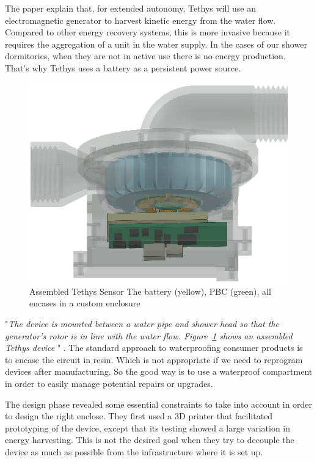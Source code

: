 \documentclass[10pt,journal,compsoc]{IEEEtran}
\begin{document}
The paper explain that, for extended autonomy, Tethys will use an electromagnetic generator to harvest kinetic energy from the water flow. Compared to other energy recovery systems, this is more invasive because it requires the aggregation of a unit in the water supply. In the cases of our shower dormitories, when they are not in active use there is no energy production. That's why Tethys uses a battery as a persistent power source.
\begin{center}
    \begin{figure}[!t]
        \includegraphics[scale=0.45]{assembled-tethys-sensor.png}
        \caption{\label{étiquette} Assembled Tethys Sensor\cite{IEEEhowto:} The battery (yellow), PBC (green), all encases in a custom enclosure}
    \end{figure}

\end{center}
"\emph{The device is mounted between a water pipe and shower head so
that the generator’s rotor is in line with the water flow. Figure~\ref{étiquette} shows an assembled Tethys device }" \cite{IEEEhowto:}.
The standard approach to waterproofing consumer products is to encase the circuit in resin. Which is not appropriate if we need to reprogram devices after manufacturing. So the good way is to use a waterproof  compartment in order to easily manage potential repairs or upgrades.

The design phase revealed some essential constraints to take into account in order to design the right enclose. They first used a 3D printer that facilitated prototyping of the device, except that its testing showed a large variation in energy harvesting. This is not the desired goal when they try to decouple the device as much as possible from the infrastructure where it is set up.
\end{document}
